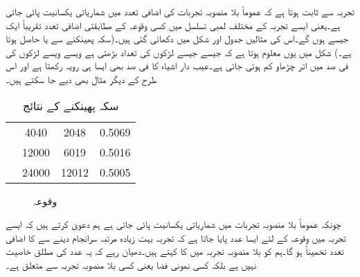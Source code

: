 تجربہ سے ثابت ہوتا ہے کہ عموماً بلا منصوبہ تجربات کی اضافی تعدد میں شماریاتی یکسانیت پائی جاتی ہے۔یعنی ایسے تجربہ کے مختلف لمبی تسلسل میں کسی وقوعہ کے مطابقتی اضافی تعدد  تقریباً ایک جیسے ہوں گے۔اس کی مثالیں جدول  اور شکل  میں دکھائی گئی ہیں۔(سکہ پھینکنے سے  یا  حاصل ہوتا ہے۔)  شکل  میں یوں معلوم ہوتا ہے کہ جیسے جیسے لڑکوں کی تعداد بڑھتی ہے ویسے ویسے لڑکوں کی فی صد میں اتر چڑھاو کم ہوتی جاتی ہے۔عیب دار اشیاء کا فی صد بھی  ایسا ہی رویہ رکھتا ہے اور اس طرح کے دیگر مثال بھی دیے جا سکتے ہیں۔   
\begin{table}
\caption{سکہ پھینکنے کے نتائج}
\label{جدول_شماریات_سکہ_پھینکنے_کے_نتائج}
\centering
\begin{otherlanguage}{english}
\begin{tabular}{C|C|C|C}
\hline
{}&&&\\
\hline
{}& \num{4040}&\num{2048}&\num{0.5069}\\
& \num{12000}&\num{6019}&\num{0.5016}\\
& \num{24000}&\num{12012}&\num{0.5005}\\
\hline
\end{tabular}
\end{otherlanguage}
\end{table}
\begin{figure}
\centering
{}
\caption{وقوعہ }
\label{شکل_شماریات_وقوعہ_لڑکا}
\end{figure}

چونکہ عموماً بلا منصوبہ تجربات میں شماریاتی یکسانیت پائی جاتی ہے ہم  دعویٰ کرتے ہیں کہ ایسے تجربہ میں وقوعہ  کے لئے ایسا عدد  پایا جاتا ہے کہ تجربہ بہت زیادہ مرتبہ سرانجام دینے سے   کا اضافی تعدد تخمیناً  ہو گا۔ہم  کو  بلا منصوبہ تجربہ میں  کا  کہتے ہیں۔دھیان رہے کہ یہ عدد  کی مطلق خاصیت نہیں ہے بلکہ کسی نمونی فضا  یعنی کسی بلا منصوبہ تجربہ سے متعلق ہے۔

